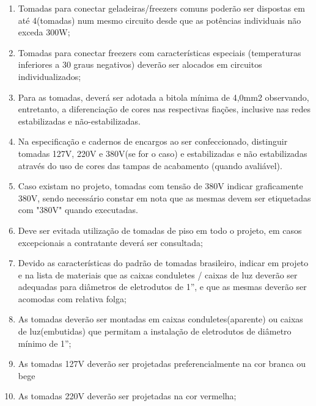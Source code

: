 \begin{enumerate}
	\item Tomadas para conectar geladeiras/freezers comuns poderão ser dispostas em até 4(tomadas) num mesmo circuito desde que as potências individuais não exceda 300W;
	
	\item Tomadas para conectar freezers com características especiais (temperaturas inferiores a 30 graus negativos) deverão ser alocados em circuitos individualizados;

	\item Para as tomadas, deverá ser adotada a bitola mínima de 4,0mm2 observando, entretanto, a diferenciação de cores nas respectivas fiações, inclusive nas redes estabilizadas e não-estabilizadas.

	\item Na especificação e cadernos de encargos ao ser confeccionado, distinguir tomadas 127V, 220V e 380V(se for o caso) e estabilizadas e não estabilizadas através do uso de cores das tampas de acabamento (quando avaliável).
	
	\item Caso existam no projeto, tomadas com tensão de 380V indicar graficamente 380V, sendo necessário constar em nota que as mesmas devem ser etiquetadas com "380V" quando executadas.
	
	\item Deve ser evitada utilização de tomadas de piso em todo o projeto, em casos excepcionais a contratante deverá ser consultada;
	
	\item Devido as características do padrão de tomadas brasileiro, indicar em projeto e na lista de materiais que as caixas conduletes / caixas de luz deverão ser adequadas para diâmetros de eletrodutos de 1”, e que as mesmas deverão ser acomodas com relativa folga;
	
	\item As tomadas deverão ser montadas em caixas conduletes(aparente) ou caixas de luz(embutidas) que permitam a instalação de eletrodutos de diâmetro mínimo de 1”;
	
	\item As tomadas 127V deverão ser projetadas preferencialmente na cor branca ou bege
	
	\item As tomadas 220V deverão ser projetadas na cor vermelha;
	

\end{enumerate}
